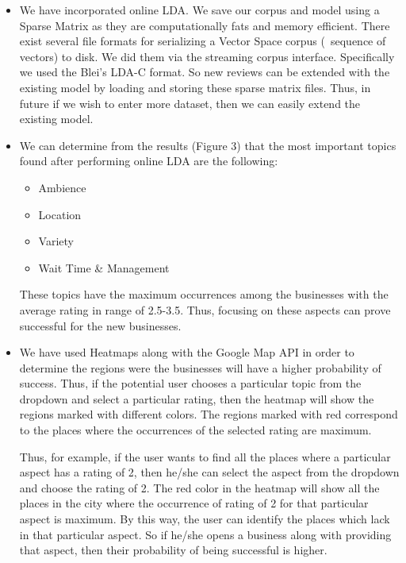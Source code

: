 \documentclass[12pt]{article} %
\begin{document}
\begin{itemize}

\item We have incorporated online LDA. We save our corpus and model using a Sparse Matrix as they are computationally fats and memory efficient. There exist several file formats for serializing a Vector Space corpus (~sequence of vectors) to disk. We did them via the streaming corpus interface. Specifically we used the Blei's LDA-C format. So new reviews can be extended with the existing model by loading and storing these sparse matrix files. Thus, in future if  we wish to enter more dataset, then we can easily extend the existing model.

\item We can determine from the results (Figure 3) that the most important topics found after performing online LDA are the following:

	\begin{itemize}
	\item Ambience
	\item Location
	\item Variety
	\item Wait Time \& Management
	\end{itemize}
	
These topics have the maximum occurrences among the businesses with the average rating in range of 2.5-3.5. Thus, focusing on these aspects can prove successful for the new businesses.

\item We have used Heatmaps along with the Google Map API in order to determine the regions were the businesses will have a higher probability of success. Thus, if the potential user chooses a particular topic from the dropdown and select a particular rating, then the heatmap will show the regions marked with different colors. The regions marked with red correspond to the places where the occurrences of the selected rating are maximum.

Thus, for example, if the user wants to find all the places where a particular aspect has a rating of 2, then he/she can select the aspect from the dropdown and choose the rating of 2. The red color in the heatmap will show all the places in the city where the  occurrence of rating of 2 for that particular aspect is maximum. By this way, the user can identify the places which lack in that particular aspect. So if he/she opens a business along with providing that aspect, then their probability of being successful is higher.


\end{itemize}
\end{document}
